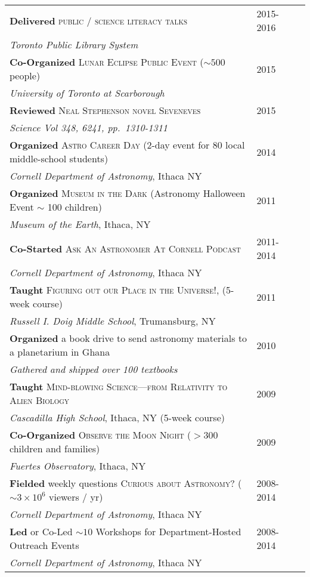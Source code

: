 \documentclass[10pt]{article} %
\begin{document}
{\begin{tabular}{l>{\hfill}p{2.9cm}r}
{\bf Delivered} \textsc{public / science literacy talks} & 2015-2016 \\
{\it Toronto Public Library System} \\
{\bf Co-Organized} \textsc{Lunar Eclipse Public Event} ($\sim 500$ people) & 2015\\
{\it University of Toronto at Scarborough} \\
{\bf Reviewed} \textsc{Neal Stephenson novel Seveneves} & 2015\\
{\it Science Vol 348, 6241, pp.~1310-1311} \\
{\bf Organized} \textsc{Astro Career Day} (2-day event for 80 local middle-school students) & 2014\\
{\it Cornell Department of Astronomy}, Ithaca NY \\
{\bf Organized} \textsc{Museum in the Dark} (Astronomy Halloween Event $\sim$ 100 children) & 2011\\
{\it Museum of the Earth}, Ithaca, NY \\
{\bf Co-Started} \textsc{Ask An Astronomer At Cornell Podcast} & 2011-2014\\
{\it Cornell Department of Astronomy}, Ithaca NY  \\
{\bf Taught} \textsc{Figuring out our Place in the Universe!}, (5-week course) & 2011\\ 
{\it Russell I. Doig Middle School}, Trumansburg, NY \\
{\bf Organized} a book drive to send astronomy materials to a planetarium in Ghana & 2010\\
{\it Gathered and shipped over 100 textbooks} \\
{\bf Taught} \textsc{Mind-blowing Science---from Relativity to Alien Biology} & 2009\\
{\it Cascadilla High School}, Ithaca, NY (5-week course) \\
{\bf Co-Organized} \textsc{Observe the Moon Night} ($> 300$ children and families) & 2009\\
{\it Fuertes Observatory}, Ithaca, NY \\
{\bf Fielded} weekly questions \textsc{Curious about Astronomy?}  ($\sim 3\times10^6$ viewers / yr) & 2008-2014\\
{\it Cornell Department of Astronomy}, Ithaca NY \\
{\bf Led} or Co-Led $\sim 10$ Workshops for Department-Hosted Outreach Events & 2008-2014 \\
{\it Cornell Department of Astronomy}, Ithaca NY
\end{tabular}


}
\end{document}
